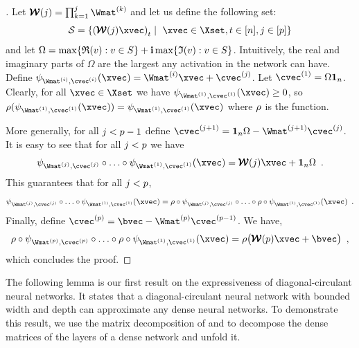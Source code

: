 \begin{proof}[]
  Let $\pmb{\mathcal{W}}(j) = \prod_{k=1}^{j} \Wmat^{(k)}$ and let us define the following set:
  \begin{equation}
    \mathcal{S} = \left\{ \left(\pmb{\mathcal{W}}(j) \xvec \right)_{t} \mid \ \xvec \in \Xset, t \in [n], j \in [\depth] \right\}
  \end{equation}
  and let $\Omega = \max\left\{ \mathfrak{R}(v): v \in S \right\} + \ci \max\left\{ \mathfrak{I}(v):v \in S \right\}$.
  Intuitively, the real and imaginary parts of $\Omega$ are the largest any activation in the network can have.
  Define $\psi_{\Wmat^{(i)}, \cvec^{(i)}}(\xvec) = \Wmat^{(i)} \xvec + \cvec^{(j)}$. Let $\cvec^{(1)} = \Omega \onevec{n}$.
  Clearly, for all $\xvec \in \Xset$ we have $\psi_{\Wmat^{(1)}, \cvec^{(1)}}(\xvec) \ge 0$, so $\act(\psi_{\Wmat^{(1)}, \cvec^{(1)}}(\xvec)) = \psi_{\Wmat^{(1)}, \cvec^{(1)}}(\xvec)$ where $\rho$ is the \relu function.

  \noindent
  More generally, for all $j < p-1$ define $\cvec^{(j+1)} = \onevec{n} \Omega - \Wmat^{(j+1)} \cvec^{(j)}$.
  It is easy to see that for all $j < p$ we have 
  \begin{equation}
    \psi_{\Wmat^{(j)}, \cvec^{(j)}}\circ \ldots \circ \psi_{\Wmat^{(1)}, \cvec^{(1)}}(\xvec) = \pmb{\mathcal{W}}(j) \xvec + \onevec{n} \Omega \enspace.
  \end{equation}
  This guarantees that for all $j < p$,
  \begin{equation}
    \psi_{\Wmat^{(j)}, \cvec^{(j)}} \circ \ldots \circ \psi_{\Wmat^{(1)}, \cvec^{(1)}}(\xvec) = \act \circ \psi_{\Wmat^{(j)}, \cvec^{(j)}} \circ \ldots \circ \act \circ \psi_{\Wmat^{(1)}, \cvec^{(1)}}(\xvec) \enspace.
  \end{equation}
  Finally, define $\cvec^{(\depth)} = \bvec - \Wmat^{(\depth)} \cvec^{(\depth-1)}$.
  We have,
  \begin{equation}
    \act \circ \psi_{\Wmat^{(\depth)}, \cvec^{(\depth)}} \circ \ldots \circ \act \circ \psi_{\Wmat^{(1)}, \cvec^{(1)}}(\xvec) = \act \big( \pmb{\mathcal{W}}(\depth) \xvec + \bvec \big) \enspace,
  \end{equation}
  which concludes the proof.
\end{proof}
  
The following lemma is our first result on the expressiveness of diagonal-circulant neural networks.
It states that a diagonal-circulant neural network with bounded width and depth can approximate any dense neural networks.
To demonstrate this result, we use the matrix decomposition of  and  to decompose the dense matrices of the layers of a dense network and unfold it.

